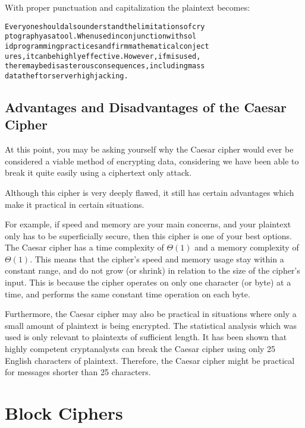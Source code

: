 \documentclass[12pt, a4paper, draft]{report}
\begin{document}

With proper punctuation and capitalization the plaintext becomes:

\begin{alltt}
Everyone should also understand the limitations of cry
ptography as a tool. When used in conjunction with sol
id programming practices and firm mathematical conject
ures, it can be highly effective. However, if misused,
there may be disasterous consequences, including mass
data theft or server highjacking.
\end{alltt}

\subsection{Advantages and Disadvantages of the Caesar Cipher}

At this point, you may be asking yourself why the Caesar cipher would
ever be considered a viable method of encrypting data, considering we
have been able to break it quite easily using a ciphertext only attack.

Although this cipher is very deeply flawed, it still has certain
advantages which make it practical in certain situations.

For example, if speed and memory are your main concerns, and your
plaintext only has to be superficially secure, then this cipher is one
of your best options. The Caesar cipher has a time complexity of
$\Theta(1)$ and a memory complexity of $\Theta(1)$. This means that
the cipher's speed and memory usage stay within a constant range, and
do not grow (or shrink) in relation to the size of the cipher's input.
This is because the cipher operates on only one character (or byte) at
a time, and performs the same constant time operation on each byte.

Furthermore, the Caesar cipher may also be practical in situations where
only a small amount of plaintext is being encrypted. The statistical
analysis which was used is only relevant to plaintexts of sufficient
length. It has been shown that highly competent cryptanalysts can break
the Caesar cipher using only 25 English characters of plaintext.
Therefore, the Caesar cipher might be practical for messages shorter than
25 characters.

\section{Block Ciphers}
\end{document}

